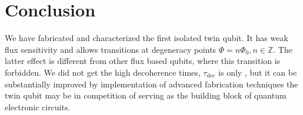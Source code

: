 \section{Conclusion}
\noindent We  have fabricated and  characterized the first isolated  twin qubit.  It  has weak
flux  sensitivity  and   allows  \ilra  {}  transitions   at  degeneracy  points
$ \Phi =  n\Phi_0, n\in\mathbb{Z} $. The latter  effect is different from other flux  based qubits, where  this   transition  is  forbidden.   We   did  not  get  the   high  decoherence  times,
$\tau_{\text{dec}}$  is   only  ,   but  it  can   be  substantially   improved  by
implementation of  advanced fabrication  techniques the  twin qubit may  be in  competition of
serving as the building block of quantum electronic circuits.


\noindent
